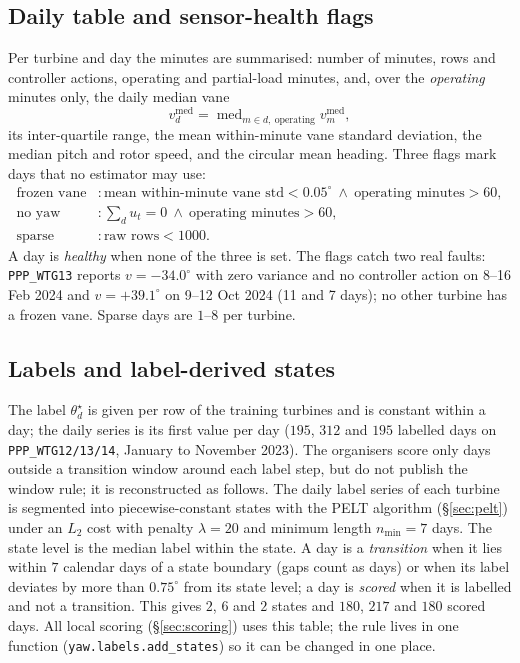 \documentclass[11pt,a4paper]{article}
\theoremstyle{remark}
\newcommand{\med}{\operatorname{med}}
\newcommand{\dg}{^{\circ}}
\newcommand{\code}[1]{\texttt{#1}}
\begin{document}
\subsection{Daily table and sensor-health flags}\label{sec:health}
Per turbine and day the minutes are summarised: number of minutes, rows and
controller actions, operating and partial-load minutes, and, over the
\emph{operating} minutes only, the daily median vane
\begin{equation}
  v^{\med}_d = \med_{m\in d,\ \text{operating}} v^{\med}_m ,
  \label{eq:vane_daily}
\end{equation}
its inter-quartile range, the mean within-minute vane standard deviation, the
median pitch and rotor speed, and the circular mean heading. Three flags mark
days that no estimator may use:
\begin{align*}
  \text{frozen vane} &: \text{mean within-minute vane std} < 0.05\dg \ \wedge\ \text{operating minutes} > 60,\\
  \text{no yaw}      &: \textstyle\sum_d u_t = 0 \ \wedge\ \text{operating minutes} > 60,\\
  \text{sparse}      &: \text{raw rows} < 1000 .
\end{align*}
A day is \emph{healthy} when none of the three is set. The flags catch two real
faults: \code{PPP\_WTG13} reports $v=-34.0\dg$ with zero variance and no
controller action on 8--16 Feb 2024 and $v=+39.1\dg$ on 9--12 Oct 2024 (11 and 7
days); no other turbine has a frozen vane. Sparse days are $1$--$8$ per turbine.

\subsection{Labels and label-derived states}\label{sec:labels}
The label $\theta^\star_d$ is given per row of the training turbines and is
constant within a day; the daily series is its first value per day
($195$, $312$ and $195$ labelled days on \code{PPP\_WTG12/13/14}, January to
November 2023). The organisers score only days outside a transition window
around each label step, but do not publish the window rule; it is reconstructed
as follows. The daily label series of each turbine is segmented into
piecewise-constant states with the PELT algorithm (\S\ref{sec:pelt}) under an
$L_2$ cost with penalty $\lambda=20$ and minimum length $n_{\min}=7$ days. The
state level is the median label within the state. A day is a \emph{transition}
when it lies within $7$ calendar days of a state boundary (gaps count as days)
or when its label deviates by more than $0.75\dg$ from its state level; a day is
\emph{scored} when it is labelled and not a transition. This gives $2$, $6$ and
$2$ states and $180$, $217$ and $180$ scored days. All local scoring
(\S\ref{sec:scoring}) uses this table; the rule lives in one function
(\code{yaw.labels.add\_states}) so it can be changed in one place.
\end{document}
